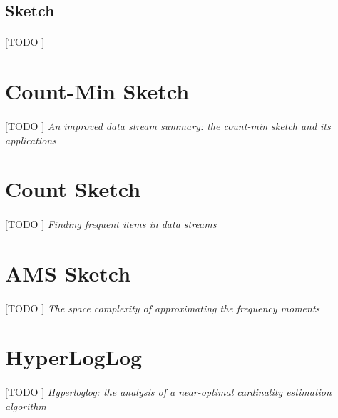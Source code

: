 \documentclass{subfiles}
\begin{document}
      \subsection{Sketch}
      \label{sec:sketch}

        \paragraph{}
        [TODO ]

    \section{Count-Min Sketch}
    \label{sec:count_min_sketch}

      \paragraph{}
      [TODO ] \emph{An improved data stream summary: the count-min sketch and its applications} \cite{cormode2005improved}

    \section{Count Sketch}
    \label{sec:count_sketch}

      \paragraph{}
      [TODO ] \emph{Finding frequent items in data streams} \cite{charikar2002finding}

    \section{AMS Sketch}
    \label{sec:ams_sketch}

      \paragraph{}
      [TODO ] \emph{The space complexity of approximating the frequency moments} \cite{alon1996space}

    \section{HyperLogLog}
    \label{sec:hyper_log_log}

      \paragraph{}
      [TODO ] \emph{Hyperloglog: the analysis of a near-optimal cardinality estimation algorithm} \cite{flajolet2007hyperloglog}
\end{document}
